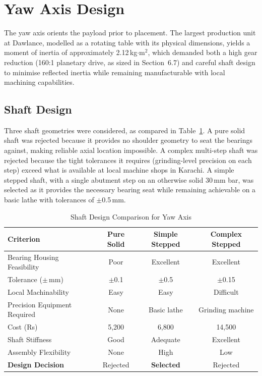 \section{Yaw Axis Design}

The yaw axis orients the payload prior to placement. The largest production unit 
at Dawlance, modelled as a rotating table with its physical dimensions, yields a 
moment of inertia of approximately 2.12\,kg$\cdot$m$^2$, which demanded both a 
high gear reduction (160:1 planetary drive, as sized in Section~6.7) and careful 
shaft design to minimise reflected inertia while remaining manufacturable with 
local machining capabilities.

\subsection{Shaft Design}

Three shaft geometries were considered, as compared in Table~\ref{tab:yaw_shaft_design}. A pure solid shaft was rejected because it provides no shoulder geometry to seat the bearings against, making reliable axial location impossible. A complex multi-step shaft was rejected because the tight tolerances it requires (grinding-level precision on each step) exceed what is available at local machine shops in Karachi. A simple stepped shaft, with a single abutment step on an otherwise solid 30\,mm bar, was selected as it provides the necessary bearing seat while remaining achievable on a basic lathe with tolerances of $\pm$0.5\,mm.

\begin{table}[htbp]
    \centering
    \caption{Shaft Design Comparison for Yaw Axis}
    \label{tab:yaw_shaft_design}
    \begin{tabular}{l c c c}
        \toprule
        \textbf{Criterion} & \textbf{Pure Solid} & \textbf{Simple Stepped} 
                           & \textbf{Complex Stepped} \\
                           \midrule
        Bearing Housing Feasibility & Poor & Excellent & Excellent \\
        Tolerance (\(\pm\,\)mm) & \(\pm\)0.1 & \(\pm\)0.5 
                                              & \(\pm\)0.15 \\
        Local Machinability & Easy & Easy & Difficult \\
        Precision Equipment Required & None & Basic lathe & Grinding machine \\
        Cost (Rs) & 5,200 & 6,800 & 14,500 \\
        Shaft Stiffness & Good & Adequate & Excellent \\
        Assembly Flexibility & None & High & Low \\
        \textbf{Design Decision} & Rejected & \textbf{Selected} & Rejected \\
        \bottomrule
    \end{tabular}
\end{table}

